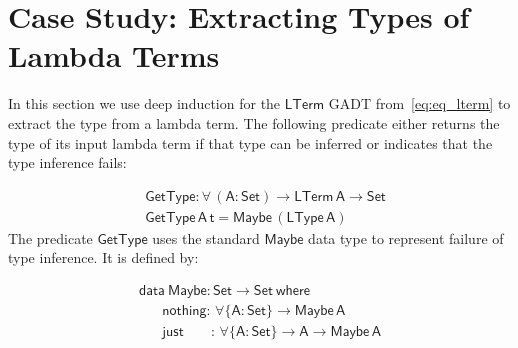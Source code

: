 \documentclass[9pt]{entcs}
\begin{document}
\section{Case Study: Extracting Types of Lambda Terms}\label{sec:app}

In this section we use deep induction for the $\mathsf{LTerm}$ GADT
from~\eqref{eq:eq_lterm} to extract the type from a lambda term.  The
following predicate either returns the type of its input lambda term
if that type can be inferred or indicates that the type inference
fails:

\vspace*{-0.3in}

\begin{align*}
  &\mathsf{GetType : \forall \, (A : Set) \to LTerm\,A \to Set} \\
  &\mathsf{GetType \,A \,t = Maybe \, (LType \, A)}
\end{align*}
The predicate $\mathsf{GetType}$ uses the standard $\mathsf{Maybe}$
data type to represent failure of type inference. It is defined by:

\vspace*{-0.1in}

\begin{equation}\label{eq:maybe}
\begin{array}{l}
\mathsf{data\ Maybe : Set \to Set\ where}\\
\mathsf{\;\;\;\;\;\;nothing :\,  \forall \{A : Set\} \to Maybe\,A}\\
\mathsf{\;\;\;\;\;\;just\;\;\;\;\;\;\; :\,  \forall \{A : Set\} \to A \to Maybe\,A}
\end{array}
\end{equation}
\end{document}
